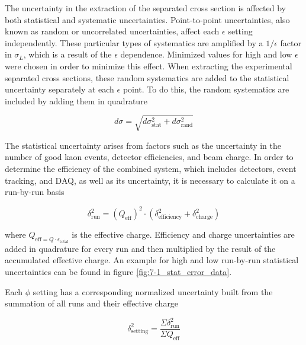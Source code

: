 \documentclass[
]{report}
\begin{document}
\label{Chapter-5-3}

The uncertainty in the extraction of the separated cross section is
affected by both statistical and systematic uncertainties.
Point-to-point uncertainties, also known as random or uncorrelated
uncertainties, affect each \(\epsilon\) setting independently. These
particular types of systematics are amplified by a \(1/\epsilon\) factor
in \(\sigma_L\), which is a result of the \(\epsilon\) dependence.
Minimized values for high and low \(\epsilon\) were chosen in order to
minimize this effect. When extracting the experimental separated cross
sections, these random systematics are added to the statistical
uncertainty separately at each \(\epsilon\) point. To do this, the
random systematics are included by adding them in quadrature

\begin{equation} 
    d\sigma=\sqrt{d\sigma_{\mathrm{stat}}^2+d\sigma_{\mathrm{rand}}^2}
  \label{eq:sig_error} 
\end{equation}

The statistical uncertainty arises from factors such as the uncertainty
in the number of good kaon events, detector efficiencies, and beam
charge. In order to determine the efficiency of the combined system,
which includes detectors, event tracking, and DAQ, as well as its
uncertainty, it is necessary to calculate it on a run-by-run basis

\begin{equation} 
    \delta_{\mathrm{run}}^2=(Q_{\mathrm{eff}})^2\cdot(\delta_{\mathrm{efficiency}}^2+\delta_{\mathrm{charge}}^2)
  \label{eq:stat_error_run} 
\end{equation}

\noindent where \(Q_{\mathrm{eff}=Q\cdot\epsilon_{\mathrm{total}}}\) is
the effective charge. Efficiency and charge uncertainties are added in
quadrature for every run and then multiplied by the result of the
accumulated effective charge. An example for high and low run-by-run
statistical uncertainties can be found in figure
\ref{fig:7-1_stat_error_data}.



Each \(\phi\) setting has a corresponding normalized uncertainty built
from the summation of all runs and their effective charge

\begin{equation} 
    \delta_{\mathrm{setting}}^2=\frac{\Sigma\delta_{\mathrm{run}}^2}{\Sigma Q_{\mathrm{eff}}}
  \label{eq:stat_error_setting} 
\end{equation}
\end{document}
